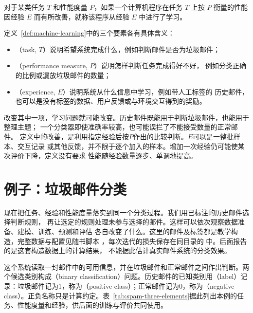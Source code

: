 \begin{definition}[机器学习]
\label{def:machine-learning}
对于某类任务 $T$ 和性能度量 $P$，如果一个计算机程序在任务 $T$ 上按 $P$ 衡量的性能
因经验 $E$ 而有所改善，就称该程序从经验 $E$ 中进行了学习。
\end{definition}

定义~\ref{def:machine-learning}中的三个要素各有具体含义：

\begin{itemize}
  \item {}（task, $T$）说明希望系统完成什么，例如判断邮件是否为垃圾邮件；
  \item {}（performance measure, $P$）说明怎样判断任务完成得好不好，
    例如分类正确的比例或漏放垃圾邮件的数量；
  \item {}（experience, $E$）说明系统从什么信息中学习，例如带人工标签的
    历史邮件，也可以是没有标签的数据、用户反馈或与环境交互得到的奖励。
\end{itemize}

改变其中一项，学习问题就可能改变。历史邮件既能用于判断垃圾邮件，也能用于整理主题；
一个分类器即使准确率较高，也可能误拦了不能接受数量的正常邮件。
定义中的改善，是利用指定经验后按$P$作出的比较判断。$E$可以是一整批样本、交互记录
或其他反馈，并不限于逐个加入的样本。增加一次经验仍可能使某次评价下降，定义没有要求
性能随经验数量逐步、单调地提高。

\section{例子：垃圾邮件分类}
\label{sec:spam-classification-example}

现在把任务、经验和性能度量落实到同一个分类过程。我们用已标注的历史邮件选择判断规则，
再让选定的规则处理未参与选择的邮件。这样可以依次观察数据准备、建模、训练、预测和评估
各自改变了什么。这里的邮件及标签都是教学构造，完整数据与配置见随书脚本
，每次迭代的损失保存在同目录的
中。后面报告的是这套构造数据上的计算结果，
不能据此估计真实邮件系统的分类效果。

这个系统读取一封邮件中的可用信息，并在垃圾邮件和正常邮件之间作出判断。两个候选类别构成（binary classification）问题。历史邮件的已知类别用（label）记录：垃圾邮件记为$1$，称为（positive class）；正常邮件记为$0$，称为（negative class）。正负名称只是计算约定。表~\ref{tab:spam-three-elements}据此列出本例的任务、性能度量和经验，供后面的训练与评价共同使用。

